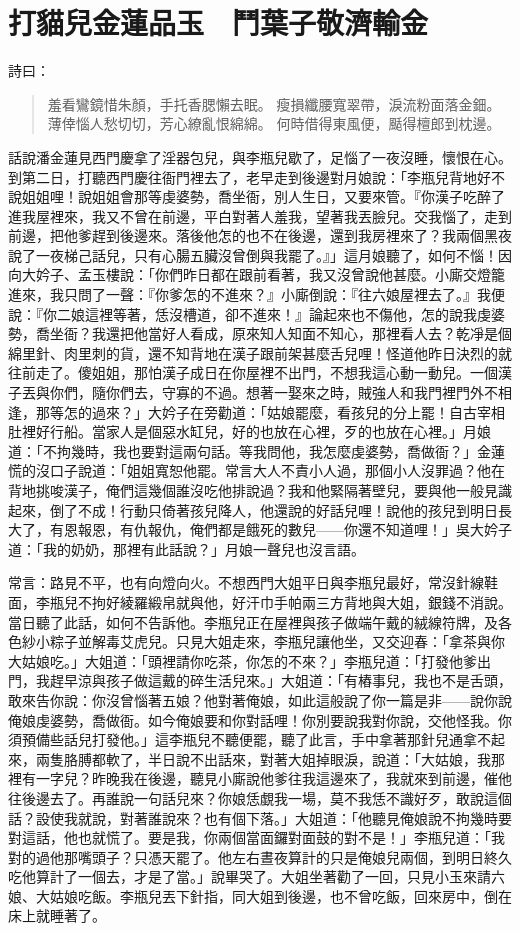 
\chapter{打貓兒金蓮品玉　鬥葉子敬濟輸金}

詩曰：
\begin{quote}
羞看鸞鏡惜朱顏，手托香腮懶去眠。
瘦損纖腰寬翠帶，淚流粉面落金鈿。
薄倖惱人愁切切，芳心繚亂恨綿綿。
何時借得東風便，颳得檀郎到枕邊。
\end{quote}

話說潘金蓮見西門慶拿了淫器包兒，與李瓶兒歇了，足惱了一夜沒睡，懷恨在心。到第二日，打聽西門慶往衙門裡去了，老早走到後邊對月娘說：「李瓶兒背地好不說姐姐哩！說姐姐會那等虔婆勢，喬坐衙，別人生日，又要來管。『你漢子吃醉了進我屋裡來，我又不曾在前邊，平白對著人羞我，望著我丟臉兒。交我惱了，走到前邊，把他爹趕到後邊來。落後他怎的也不在後邊，還到我房裡來了？我兩個黑夜說了一夜梯己話兒，只有心腸五臟沒曾倒與我罷了。』」這月娘聽了，如何不惱！因向大妗子、孟玉樓說：「你們昨日都在跟前看著，我又沒曾說他甚麼。小廝交燈籠進來，我只問了一聲：『你爹怎的不進來？』小廝倒說：『往六娘屋裡去了。』我便說：『你二娘這裡等著，恁沒槽道，卻不進來！』論起來也不傷他，怎的說我虔婆勢，喬坐衙？我還把他當好人看成，原來知人知面不知心，那裡看人去？乾凈是個綿里針、肉里刺的貨，還不知背地在漢子跟前架甚麼舌兒哩！怪道他昨日決烈的就往前走了。傻姐姐，那怕漢子成日在你屋裡不出門，不想我這心動一動兒。一個漢子丟與你們，隨你們去，守寡的不過。想著一娶來之時，賊強人和我門裡門外不相逢，那等怎的過來？」大妗子在旁勸道：「姑娘罷麼，看孩兒的分上罷！自古宰相肚裡好行船。當家人是個惡水缸兒，好的也放在心裡，歹的也放在心裡。」月娘道：「不拘幾時，我也要對這兩句話。等我問他，我怎麼虔婆勢，喬做衙？」金蓮慌的沒口子說道：「姐姐寬恕他罷。常言大人不責小人過，那個小人沒罪過？他在背地挑唆漢子，俺們這幾個誰沒吃他排說過？我和他緊隔著壁兒，要與他一般見識起來，倒了不成！行動只倚著孩兒降人，他還說的好話兒哩！說他的孩兒到明日長大了，有恩報恩，有仇報仇，俺們都是餓死的數兒——你還不知道哩！」吳大妗子道：「我的奶奶，那裡有此話說？」月娘一聲兒也沒言語。

常言：路見不平，也有向燈向火。不想西門大姐平日與李瓶兒最好，常沒針線鞋面，李瓶兒不拘好綾羅緞帛就與他，好汗巾手帕兩三方背地與大姐，銀錢不消說。當日聽了此話，如何不告訴他。李瓶兒正在屋裡與孩子做端午戴的絨線符牌，及各色紗小粽子並解毒艾虎兒。只見大姐走來，李瓶兒讓他坐，又交迎春：「拿茶與你大姑娘吃。」大姐道：「頭裡請你吃茶，你怎的不來？」李瓶兒道：「打發他爹出門，我趕早涼與孩子做這戴的碎生活兒來。」大姐道：「有樁事兒，我也不是舌頭，敢來告你說：你沒曾惱著五娘？他對著俺娘，如此這般說了你一篇是非——說你說俺娘虔婆勢，喬做衙。如今俺娘要和你對話哩！你別要說我對你說，交他怪我。你須預備些話兒打發他。」這李瓶兒不聽便罷，聽了此言，手中拿著那針兒通拿不起來，兩隻胳膊都軟了，半日說不出話來，對著大姐掉眼淚，說道：「大姑娘，我那裡有一字兒？昨晚我在後邊，聽見小廝說他爹往我這邊來了，我就來到前邊，催他往後邊去了。再誰說一句話兒來？你娘恁覷我一場，莫不我恁不識好歹，敢說這個話？設使我就說，對著誰說來？也有個下落。」大姐道：「他聽見俺娘說不拘幾時要對這話，他也就慌了。要是我，你兩個當面鑼對面鼓的對不是！」李瓶兒道：「我對的過他那嘴頭子？只憑天罷了。他左右晝夜算計的只是俺娘兒兩個，到明日終久吃他算計了一個去，才是了當。」說畢哭了。大姐坐著勸了一回，只見小玉來請六娘、大姑娘吃飯。李瓶兒丟下針指，同大姐到後邊，也不曾吃飯，回來房中，倒在床上就睡著了。


